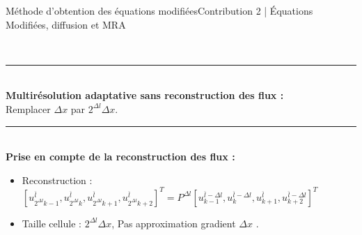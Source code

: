 \begin{frame}{Méthode d'obtention des équations modifiées}{Contribution 2 | Équations Modifiées, diffusion et MRA}
\\ \pause
    \noindent\color{Primary}\rule{\linewidth}{0.6pt}\color{black}\\
    \textbf{Multirésolution adaptative sans reconstruction des flux :}\\
    Remplacer $\Delta x$ par $2^{\Delta l} \Delta x$.\\ \pause
    \noindent\color{Primary}\rule{\linewidth}{0.6pt}\color{black}\\
    \textbf{Prise en compte de la reconstruction des flux :}\\
    \begin{itemize}
        \item Reconstruction : \small$\left[ u^{\overline l}_{2^{\Delta l}k-1} ,  u^{\overline l}_{2^{\Delta l}k}  ,  u^{\overline l}_{2^{\Delta l}k+1} ,  u^{\overline l}_{2^{\Delta l}k+2} \right]^T= P^{\Delta l} \left[ u^{\overline l- \Delta l}_{k-1} ,  u^{\overline l - \Delta l}_{k}  ,  u^{\overline l}_{k+1} ,  u^{\overline l - \Delta l}_{k+2} \right]^T$\normalsize
        \item Taille cellule : $2^{\Delta l} \Delta x$, Pas approximation gradient $\Delta x$ .
    \end{itemize}
\end{frame}